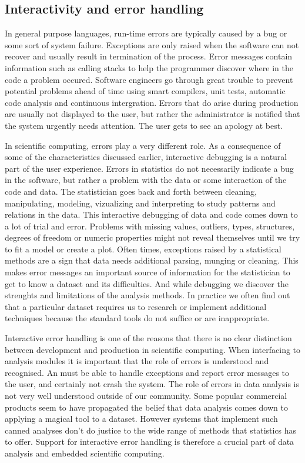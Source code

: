 \subsection{Interactivity and error handling}

In general purpose languages, run-time errors are typically caused by a bug or some sort of system failure. Exceptions are only raised when the software can not recover and usually result in termination of the process. Error messages contain information such as calling stacks to help the programmer discover where in the code a problem occured. Software engineers go through great trouble to prevent potential problems ahead of time using smart compilers, unit tests, automatic code analysis and continuous intergration. Errors that do arise during production are usually not displayed to the user, but rather the administrator is notified that the system urgently needs attention. The user gets to see an apology at best.

In scientific computing, errors play a very different role. As a consequence of some of the characteristics discussed earlier, interactive debugging is a natural part of the user experience. Errors in statistics do not necessarily indicate a bug in the software, but rather a problem with the data or some interaction of the code and data. The statistician goes back and forth between cleaning, manipulating, modeling, vizualizing and interpreting to study patterns and relations in the data. This interactive debugging of data and code comes down to a lot of trial and error. Problems with missing values, outliers, types, structures, degrees of freedom or numeric properties might not reveal themselves until we try to fit a model or create a plot. Often times, exceptions raised by a statistical methods are a sign that data needs additional parsing, munging or cleaning. This makes error messages an important source of information for the statistician to get to know a dataset and its difficulties. And while debugging we discover the strenghts and limitations of the analysis methods. In practice we often find out that a particular dataset requires us to research or implement additional techniques because the standard tools do not suffice or are inappropriate.

Interactive error handling is one of the reasons that there is no clear distinction between development and production in scientific computing. When interfacing to analysis modules it is important that the role of errors is understood and recognised. An \API must be able to handle exceptions and report error messages to the user, and certainly not crash the system. The role of errors in data analysis is not very well understood outside of our community. Some popular commercial products seem to have propagated the belief that data analysis comes down to applying a magical tool to a dataset. However systems that implement such canned analyses don't do justice to the wide range of methods that statistics has to offer. Support for interactive error handling is therefore a crucial part of data analysis and embedded scientific computing.



